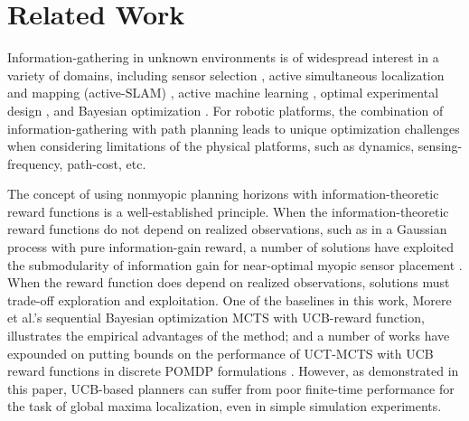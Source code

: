 \documentclass{styles/svproc}
\begin{document}
\section{Related Work}
\label{sec:related_works}

Information-gathering in unknown environments is of widespread interest in a variety of domains, including sensor selection \cite{Krause2008, KrauseDanielGolovin, Srivastava2011}, active simultaneous localization and mapping (active-SLAM) \cite{Sim2004, Charrow2015, Charrow2015a, Cadena2016}, active machine learning \cite{Zhu2010}, optimal experimental design \cite{Lorenz2015}, and Bayesian optimization \cite{Inza2000, Boender1987}. For robotic platforms, the combination of information-gathering with path planning leads to unique optimization challenges when considering limitations of the physical platforms, such as dynamics, sensing-frequency, path-cost, etc. 

The concept of using nonmyopic planning horizons with information-theoretic reward functions is a well-established principle. When the information-theoretic reward functions do not depend on realized observations, such as in a Gaussian process with pure information-gain reward, a number of solutions have exploited the submodularity of information gain for near-optimal myopic sensor placement \cite{Krause2008}.  When the reward function does depend on realized observations, solutions must trade-off exploration and exploitation. One of the baselines in this work, Morere et al.'s sequential Bayesian optimization MCTS with UCB-reward function, illustrates the empirical advantages of the method; and a number of works have expounded on putting bounds on the performance of UCT-MCTS with UCB reward functions \cite{Patten2018, Katt2017, ling2016gaussian} in discrete POMDP formulations \cite{Silver2010}. However, as demonstrated in this paper, UCB-based planners can suffer from poor finite-time performance for the task of global maxima localization, even in simple simulation experiments. %
\end{document}
